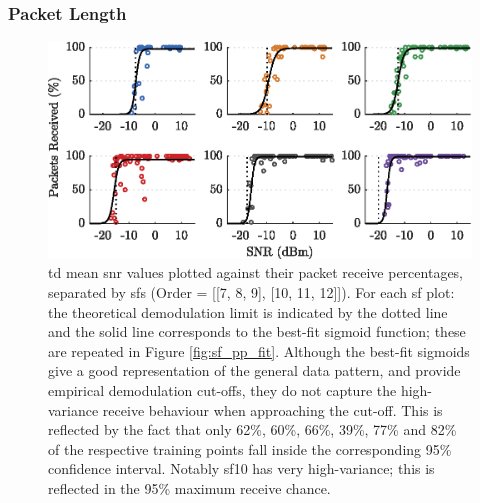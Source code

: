 \subsubsection{Packet Length}

\begin{figure}[H]
    \centering
   	\includegraphics{Figures/snr_pp_separate_plot}
    \caption[Plots of \ac{snr} vs Packet Receive Percentage]{
   \ac{td} mean \ac{snr} values plotted against their packet receive percentages, separated by \ac{sf}s (Order = [[7, 8, 9], [10, 11, 12]]). For each \ac{sf} plot: the theoretical demodulation limit is indicated by the dotted line and the solid line corresponds to the best-fit sigmoid function; these are repeated in Figure \ref{fig:sf_pp_fit}. Although the best-fit sigmoids give a good representation of the general data pattern, and provide empirical demodulation cut-offs, they do not capture the high-variance receive behaviour when approaching the cut-off. This is reflected by the fact that only 62\%, 60\%, 66\%, 39\%, 77\% and 82\% of the respective training points fall inside the corresponding 95\% confidence interval. Notably \ac{sf}10 has very high-variance; this is reflected in the 95\% maximum receive chance. 
    }
    \label{fig:snr_pp_separate}
\end{figure}

